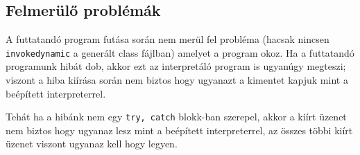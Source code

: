 \subsection{Felmerülő problémák}

A futtatandó program futása során nem merül fel probléma (hacsak nincsen \lstinline{invokedynamic} a generált class fájlban) amelyet a program okoz. Ha a futtatandó programunk hibát dob, akkor ezt az interpretáló program is ugyanúgy megteszi; viszont a hiba kiírása során nem biztos hogy ugyanazt a kimentet kapjuk mint a beépített interpreterrel.

Tehát ha a hibánk nem egy \lstinline{try, catch} blokk-ban szerepel, akkor a kiírt üzenet nem biztos hogy ugyanaz lesz mint a beépített interpreterrel, az összes többi kiírt üzenet viszont ugyanaz kell hogy legyen.